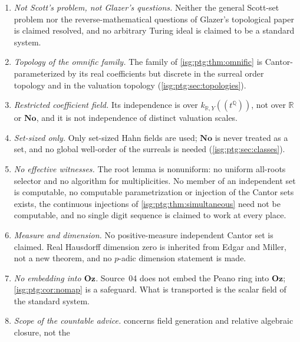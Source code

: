 \documentclass[11pt]{article}
\theoremstyle{definition}
\theoremstyle{remark}
\newcommand{\No}{\ensuremath{\mathbf{No}}}
\newcommand{\Oz}{\ensuremath{\mathbf{Oz}}}
\newcommand{\R}{\mathbb{R}}
\newcommand{\Q}{\mathbb{Q}}
\begin{document}
\begin{enumerate}[label=\textup{(N\arabic*)},leftmargin=*]
      assembled theorem or for any component. Fatalini and Schindler's
      attribution to de Bondt and Glazer is a close precursor, credited;
      \cref{isg:ptg:lem:derivation} is near
      \cite[Proposition~2.6]{YeYuZhao}, and the relation was not compared
      at this write. Some ingredients may occur in the literature in
      another form; no ``breakthrough'' label is claimed.
\item \emph{Not Scott's problem, not Glazer's questions.} Neither the
      general Scott-set problem nor the reverse-mathematical questions of
      Glazer's topological paper is claimed resolved, and no arbitrary
      Turing ideal is claimed to be a standard system.
\item \emph{Topology of the omnific family.} The family of
      \cref{isg:ptg:thm:omnific} is Cantor-parameterized by its real
      coefficients but discrete in the surreal order topology and in the
      valuation topology (\cref{isg:ptg:sec:topologies}).
\item \emph{Restricted coefficient field.} Its independence is over
      $k_{\R,Y}((t^\Q))$, not over $\R$ or $\No$, and it is not
      independence of distinct valuation scales.
\item \emph{Set-sized only.} Only set-sized Hahn fields are used; $\No$ is
      never treated as a set, and no global well-order of the surreals is
      needed (\cref{isg:ptg:sec:classes}).
\item \emph{No effective witnesses.} The root lemma is nonuniform: no
      uniform all-roots selector and no algorithm for multiplicities. No
      member of an independent set is computable, no computable
      parametrization or injection of the Cantor sets exists, the
      continuous injections of \cref{isg:ptg:thm:simultaneous} need not be
      computable, and no single digit sequence is claimed to work at every
      place.
\item \emph{Measure and dimension.} No positive-measure independent Cantor
      set is claimed. Real Hausdorff dimension zero is inherited from Edgar
      and Miller, not a new theorem, and no $p$-adic dimension statement is
      made.
\item \emph{No embedding into $\Oz$.} Source~04 does not embed the Peano
      ring into $\Oz$; \cref{isg:ptg:cor:nomap} is a safeguard. What is
      transported is the scalar field of the standard system.
\item \emph{Scope of the countable advice.} 
      concerns field generation and relative algebraic closure, not the

\end{enumerate}
\end{document}
